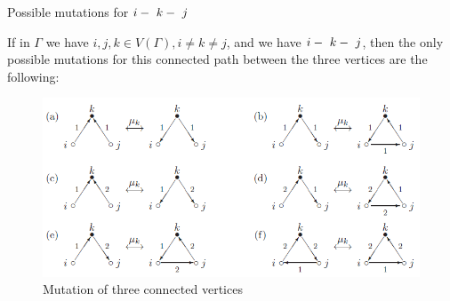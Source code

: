 \documentclass{beamer}
\begin{document}
\begin{frame}{Possible mutations for $i\--\ k\--\ j$}
\begin{corollary}
If in $\Gamma$ we have $i,j,k \in V(\Gamma), i \neq k \neq j$, and we have $i\--\ k\--\ j$, then the only possible mutations for this connected path between the three vertices are the following:
\begin{figure}[h]
\centering
\includegraphics[scale = .40]{mutation3path.PNG}
\caption{Mutation of three connected vertices}
\end{figure}
\end{corollary}
\end{frame}
\end{document}

